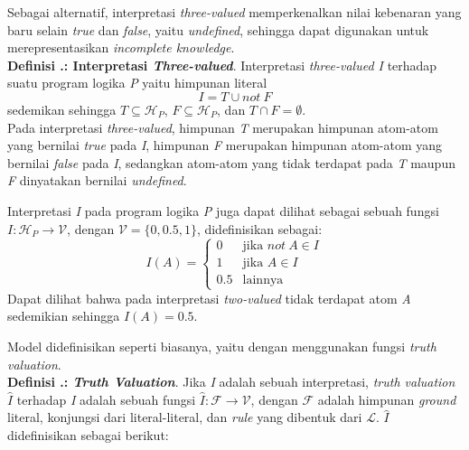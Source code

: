 Sebagai alternatif, interpretasi \textit{three-valued} memperkenalkan nilai kebenaran yang baru selain \textit{true} dan \textit{false}, yaitu \textit{undefined}, sehingga dapat digunakan untuk merepresentasikan \textit{incomplete knowledge}.
\\

\noindent \textbf{Definisi \thebabDuaNum.\thedefBabDua: Interpretasi \textit{Three-valued}}. Interpretasi \textit{three-valued I} terhadap suatu program logika \textit{P} yaitu himpunan literal
\begin{displaymath}
I = T \cup not \ F
\end{displaymath}
sedemikan sehingga $T \subseteq \mathcal{H}_P$, $F \subseteq \mathcal{H}_P$, dan $T \cap F = \emptyset$.
\\

\noindent Pada interpretasi \textit{three-valued}, himpunan \textit{T} merupakan himpunan atom-atom yang bernilai \textit{true} pada \textit{I}, himpunan \textit{F} merupakan himpunan atom-atom yang bernilai \textit{false} pada \textit{I}, sedangkan atom-atom yang tidak terdapat pada \textit{T} maupun \textit{F} dinyatakan bernilai \textit{undefined}.

Interpretasi \textit{I} pada program logika \textit{P} juga dapat dilihat sebagai sebuah fungsi $I : \mathcal{H}_P \rightarrow \mathcal{V}$, dengan $\mathcal{V} = \{0,0.5,1\}$, didefinisikan sebagai:
\begin{displaymath}
	I(A) = 
	\begin{cases}
		0 & \text{jika $not \ A \in I$} \\
		1 & \text{jika $A \in I$} \\
		0.5 & \text{lainnya}
	\end{cases}
\end{displaymath}
Dapat dilihat bahwa pada interpretasi \textit{two-valued} tidak terdapat atom \textit{A} sedemikian sehingga $I(A) = 0.5$.

Model didefinisikan seperti biasanya, yaitu dengan menggunakan fungsi \textit{truth valuation}.
\\

\noindent \textbf{Definisi \thebabDuaNum.\thedefBabDua: \textit{Truth Valuation}}. Jika \textit{I} adalah sebuah interpretasi, \textit{truth valuation} $\hat{I}$ terhadap \textit{I} adalah sebuah fungsi $\hat{I} : \mathcal{F} \rightarrow \mathcal{V}$, dengan $\mathcal{F}$ adalah himpunan \textit{ground} literal, konjungsi dari literal-literal, dan \textit{rule} yang dibentuk dari $\mathcal{L}$. $\hat{I}$ didefinisikan sebagai berikut:

